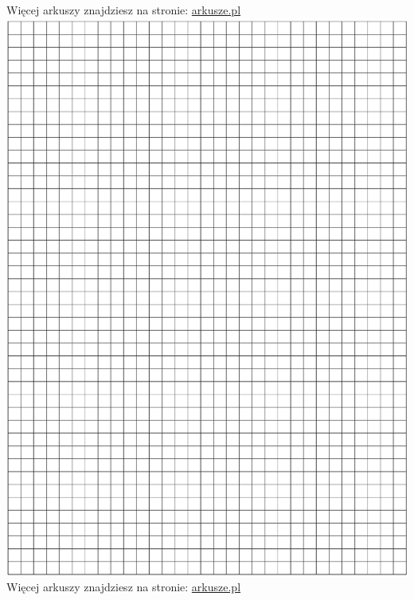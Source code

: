\documentclass[10pt]{article}
\begin{document}
Więcej arkuszy znajdziesz na stronie: \href{http://arkusze.pl}{arkusze.pl}\\
\includegraphics[max width=\textwidth, center]{2024_11_21_dd21f7544b65bcf1b3c7g-18}\\
Więcej arkuszy znajdziesz na stronie: \href{http://arkusze.pl}{arkusze.pl}\\
\end{document}
